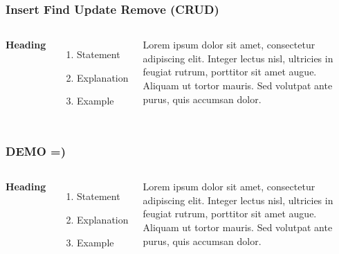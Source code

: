 \documentclass{beamer}
\begin{document}

\begin{frame}
\frametitle{Insert Find Update Remove (CRUD)}
\begin{columns}[c] %

\textbf{Heading}
\begin{enumerate}
\item Statement
\item Explanation
\item Example
\end{enumerate}

Lorem ipsum dolor sit amet, consectetur adipiscing elit. Integer lectus nisl, ultricies in feugiat rutrum, porttitor sit amet augue. Aliquam ut tortor mauris. Sed volutpat ante purus, quis accumsan dolor.

\end{columns}
\end{frame}


\begin{frame}
\frametitle{DEMO =)}
\begin{columns}[c] %

\textbf{Heading}
\begin{enumerate}
\item Statement
\item Explanation
\item Example
\end{enumerate}

Lorem ipsum dolor sit amet, consectetur adipiscing elit. Integer lectus nisl, ultricies in feugiat rutrum, porttitor sit amet augue. Aliquam ut tortor mauris. Sed volutpat ante purus, quis accumsan dolor.

\end{columns}
\end{frame}

\end{document}
